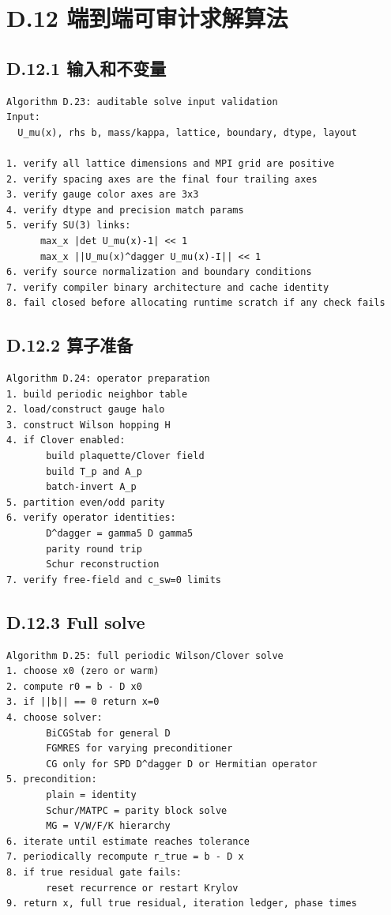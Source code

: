 \documentclass[UTF8,a4paper,10pt]{ctexart}
\begin{document}
\section{D.12 端到端可审计求解算法}
\subsection{D.12.1 输入和不变量}
\begin{Verbatim}[breaklines=true,breakanywhere=true,fontsize=\scriptsize]
Algorithm D.23: auditable solve input validation
Input:
  U_mu(x), rhs b, mass/kappa, lattice, boundary, dtype, layout

1. verify all lattice dimensions and MPI grid are positive
2. verify spacing axes are the final four trailing axes
3. verify gauge color axes are 3x3
4. verify dtype and precision match params
5. verify SU(3) links:
      max_x |det U_mu(x)-1| << 1
      max_x ||U_mu(x)^dagger U_mu(x)-I|| << 1
6. verify source normalization and boundary conditions
7. verify compiler binary architecture and cache identity
8. fail closed before allocating runtime scratch if any check fails
\end{Verbatim}
\subsection{D.12.2 算子准备}
\begin{Verbatim}[breaklines=true,breakanywhere=true,fontsize=\scriptsize]
Algorithm D.24: operator preparation
1. build periodic neighbor table
2. load/construct gauge halo
3. construct Wilson hopping H
4. if Clover enabled:
       build plaquette/Clover field
       build T_p and A_p
       batch-invert A_p
5. partition even/odd parity
6. verify operator identities:
       D^dagger = gamma5 D gamma5
       parity round trip
       Schur reconstruction
7. verify free-field and c_sw=0 limits
\end{Verbatim}
\subsection{D.12.3 Full solve}
\begin{Verbatim}[breaklines=true,breakanywhere=true,fontsize=\scriptsize]
Algorithm D.25: full periodic Wilson/Clover solve
1. choose x0 (zero or warm)
2. compute r0 = b - D x0
3. if ||b|| == 0 return x=0
4. choose solver:
       BiCGStab for general D
       FGMRES for varying preconditioner
       CG only for SPD D^dagger D or Hermitian operator
5. precondition:
       plain = identity
       Schur/MATPC = parity block solve
       MG = V/W/F/K hierarchy
6. iterate until estimate reaches tolerance
7. periodically recompute r_true = b - D x
8. if true residual gate fails:
       reset recurrence or restart Krylov
9. return x, full true residual, iteration ledger, phase times
\end{Verbatim}
\end{document}
